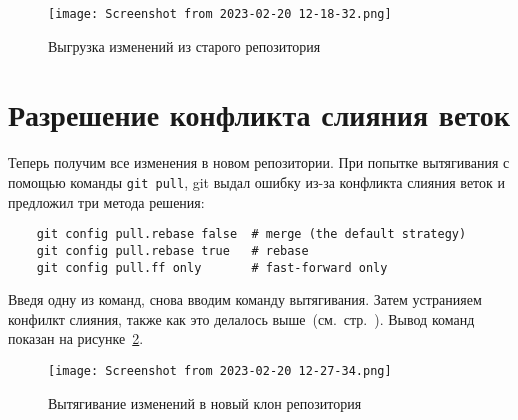 \begin{figure}[h!tp]
	\centering
	\texttt{[image: Screenshot from 2023-02-20 12-18-32.png]}
	\caption{Выгрузка изменений из старого репозитория}
	\label{3:fig:git:clone:push}
\end{figure}

\section{Разрешение конфликта слияния веток}
Теперь получим все изменения в новом репозитории.
При попытке вытягивания с помощью команды \texttt{git~pull}, git выдал
ошибку из-за конфликта слияния веток и предложил три метода решения:
\begin{verbatim}
	git config pull.rebase false  # merge (the default strategy)
	git config pull.rebase true   # rebase
	git config pull.ff only       # fast-forward only
\end{verbatim}
Введя одну из команд, снова вводим команду вытягивания. Затем устранияем
конфилкт слияния, также как это делалось
выше~(см.~стр.~\pageref{3:lb:git:merge:conflict}).
Вывод команд показан на рисунке~\ref{3:fig:git:clone:new:pull}.

\begin{figure}[h!tp]
	\centering
	\texttt{[image: Screenshot from 2023-02-20 12-27-34.png]}
	\caption{Вытягивание изменений в новый клон репозитория}
	\label{3:fig:git:clone:new:pull}
\end{figure}
